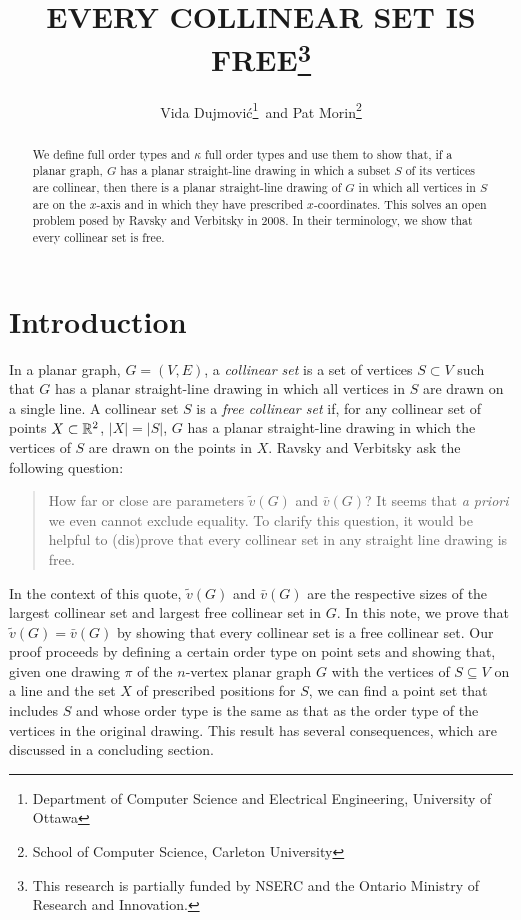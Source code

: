 \documentclass{patmorin}
\title{\MakeUppercase{Every Collinear Set is Free}\thanks{This research is partially funded by NSERC and the Ontario Ministry of Research and Innovation.}}
\author{Vida Dujmovi\'c\thanks{Department of Computer Science and Electrical Engineering, University of Ottawa}\, and Pat Morin\thanks{School of Computer Science, Carleton University}}
\begin{document}
\maketitle


\begin{abstract}
  We define full order types and $\kappa$ full order types and use them to
  show that, if a planar graph, $G$ has a planar straight-line drawing
  in which a subset $S$ of its vertices are collinear, then there is a
  planar straight-line drawing of $G$ in which all vertices in $S$ are
  on the $x$-axis and in which they have prescribed $x$-coordinates.
  This solves an open problem posed by Ravsky and Verbitsky in 2008.
  In their terminology, we show that every collinear set is free.
\end{abstract}


\section{Introduction}

In a planar graph, $G=(V,E)$, a \emph{collinear set} is a set of vertices
$S\subset V$ such that $G$ has a planar straight-line drawing in which
all vertices in $S$ are drawn on a single line.  A collinear set $S$
is a \emph{free collinear set} if, for any collinear set of points
$X\subset\mathbb{R}^2$, $|X|=|S|$, $G$ has a planar straight-line drawing in
which the vertices of $S$ are drawn on the points in $X$.  Ravsky and
Verbitsky \cite{ravsky.verbitsky:on} ask the following question:

\begin{quote}
   How far or close are parameters $\tilde{v}(G)$ and $\bar{v}(G)$? It
   seems that \emph{a priori} we even cannot exclude equality. To clarify
   this question, it would be helpful to (dis)prove that every collinear
   set in any straight line drawing is free.
\end{quote}

In the context of this quote, $\tilde{v}(G)$ and $\bar{v}(G)$ are the
respective sizes of the largest collinear set and largest free collinear
set in $G$.  In this note, we prove that $\tilde{v}(G)=\bar{v}(G)$ by
showing that every collinear set is a free collinear set.  Our proof
proceeds by defining a certain order type on point sets and showing
that, given one drawing $\pi$ of the $n$-vertex planar graph $G$ with
the vertices of $S\subseteq V$ on a line and the set $X$ of prescribed
positions for $S$, we can find a point set that includes $S$ and whose
order type is the same as that as the order type of the vertices in
the original drawing.  This result has several consequences, which are
discussed in a concluding section.
\end{document}
